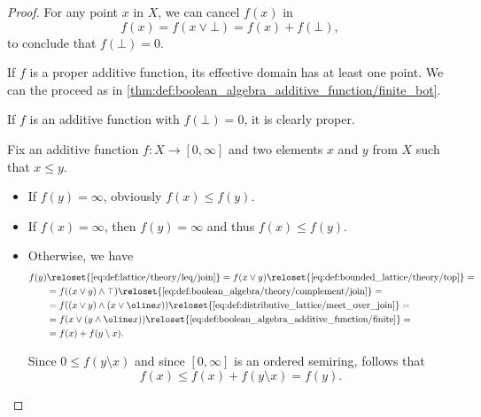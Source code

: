 \begin{proof}
   For any point \( x \) in \( X \), we can cancel \( f(x) \) in
  \begin{equation*}
    f(x) = f(x \vee \bot) = f(x) + f(\bot),
  \end{equation*}
  to conclude that \( f(\bot) = 0 \).

  \SufficiencySubProof* If \( f \) is a proper additive function, its effective domain has at least one point. We can the proceed as in \cref{thm:def:boolean_algebra_additive_function/finite_bot}.

  \NecessitySubProof* If \( f \) is an additive function with \( f(\bot) = 0 \), it is clearly proper.

   Fix an additive function \( f: X \to [0, \infty] \) and two elements \( x \) and \( y \) from \( X \) such that \( x \leq y \).

  \begin{itemize}
    \item If \( f(y) = \infty \), obviously \( f(x) \leq f(y) \).
    \item If \( f(x) = \infty \), then \( f(y) = \infty \) and thus \( f(x) \leq f(y) \).
    \item Otherwise, we have
    \begin{align*}
      f(y)
      &\reloset {\eqref{eq:def:lattice/theory/leq/join}} =
      f(x \vee y)
      \reloset {\eqref{eq:def:bounded_lattice/theory/top}} = \\ &=
      f((x \vee y) \wedge \top)
      \reloset {\eqref{eq:def:boolean_algebra/theory/complement/join}} = \\ &=
      f((x \vee y) \wedge (x \vee \oline x))
      \reloset {\eqref{eq:def:distributive_lattice/meet_over_join}} = \\ &=
      f(x \vee (y \wedge \oline x))
      \reloset {\eqref{eq:def:boolean_algebra_additive_function/finite}} = \\ &=
      f(x) + f(y \setminus x).
    \end{align*}

    Since \( 0 \leq f(y \setminus x) \) and since \( [0, \infty] \) is an ordered semiring, follows that
    \begin{equation*}
      f(x) \leq f(x) + f(y \setminus x) = f(y).
    \end{equation*}
  \end{itemize}
\end{proof}

